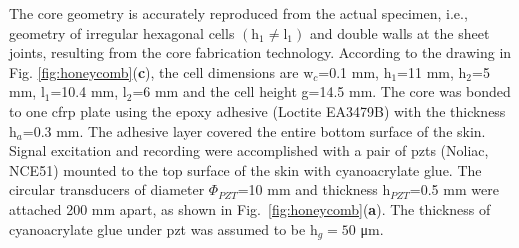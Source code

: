 The core geometry is accurately reproduced from the actual specimen, i.e., geometry of irregular hexagonal cells \(\left(\mathrm{h}_1 \ne \mathrm{l}_1\right)\) and double walls at the sheet joints, resulting from the core fabrication technology.
According to the drawing in Fig. \ref{fig:honeycomb}(\textbf{c}), the cell dimensions are \(\mathrm{w}_c\)=0.1 \unit{\mm}, h\(_1\)=11 \unit{\mm}, h\(_2\)=5 \unit{\mm}, l\(_1\)=10.4 \unit{\mm}, l\(_2\)=6 \unit{\mm} and the cell height g=14.5 \unit{\mm}.
The core was bonded to one \ac{cfrp} plate using the epoxy adhesive (Loctite EA3479B) with the thickness h\(_a\)=0.3 \unit{\mm}.
The adhesive layer covered the entire bottom surface of the skin.
%
%
%
%
%
%
%
%
Signal excitation and recording were accomplished with a pair of \acp{pzt}  (Noliac, NCE51) mounted to the top surface of the skin with cyanoacrylate glue.
The circular transducers of diameter \(\Phi_{PZT}\)=10 \unit{\mm} and thickness h\(_{PZT}\)=0.5 \unit{\mm} were attached 200 \unit{\mm} apart, as shown in Fig.~\ref{fig:honeycomb}(\textbf{a}).
The thickness of cyanoacrylate glue under \ac{pzt} was assumed to be h\(_g=50\) \unit{\micro\m}.

